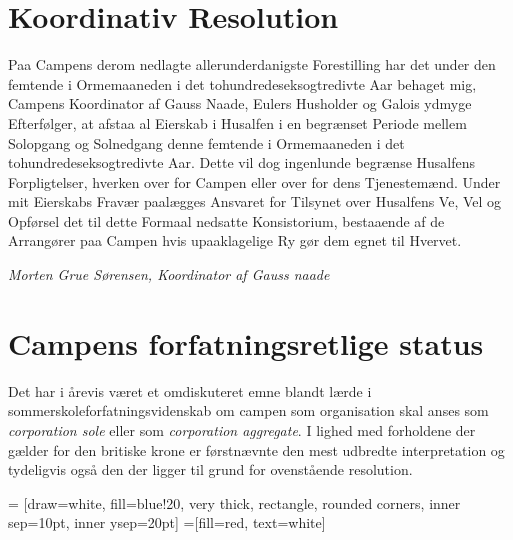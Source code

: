 

\begin{minipage}[b]{0.95\linewidth}
\begin{minipage}[t]{0.47\textwidth}
\vspace{3mm}
\section*{Koordinativ Resolution}

Paa Campens derom nedlagte allerunderdanigste Forestilling har det under den femtende i Ormemaaneden i det tohundredeseksogtredivte Aar behaget mig, Campens Koordinator af Gauss Naade, Eulers Husholder og Galois ydmyge Efterfølger, at afstaa al Eierskab i Husalfen i en begrænset Periode mellem Solopgang og Solnedgang denne femtende i Ormemaaneden i det tohundredeseksogtredivte Aar. Dette vil dog ingenlunde begrænse Husalfens Forpligtelser, hverken over for Campen eller over for dens Tjenestemænd. Under mit Eierskabs Fravær paalægges Ansvaret for Tilsynet over Husalfens Ve, Vel og Opførsel det til dette Formaal nedsatte Konsistorium, bestaaende af de Arrangører paa Campen hvis upaaklagelige Ry gør dem egnet til Hvervet.

{\flushright\emph{Morten Grue Sørensen, Koordinator af Gauss naade }}


\section*{Campens forfatningsretlige status}
Det har i årevis været et omdiskuteret emne blandt lærde i sommerskoleforfatningsvidenskab om campen som organisation skal anses som \emph{corporation sole} eller som \emph{corporation aggregate}. I lighed med forholdene der gælder for den britiske krone er førstnævnte den mest udbredte interpretation og tydeligvis også den der ligger til grund for ovenstående resolution. 

\end{minipage}
\hfill\begin{minipage}[t]{0.47\textwidth}

\vspace{1mm}
 = [draw=white, fill=blue!20, very thick,
    rectangle, rounded corners, inner sep=10pt, inner ysep=20pt]
 =[fill=red, text=white]


\end{minipage}
\end{minipage}

